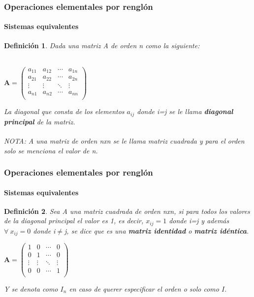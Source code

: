 \documentclass[11pt]{beamer}
\newtheorem{defi}{Definición}
\begin{document}
\begin{frame}
\frametitle{Operaciones elementales por renglón}
\framesubtitle{Sistemas equivalentes}
\begin{defi}
Dada una matriz A de orden n como la siguiente:\\ \hspace{0cm} \\
\begin{center}
${\displaystyle \mathbf {A} ={\begin{pmatrix}a_{11}&a_{12}&\cdots &a_{1n}\\a_{21}&a_{22}&\cdots &a_{2n}\\\vdots &\vdots &\ddots &\vdots \\a_{n1}&a_{n2}&\cdots &a_{nn}\\\end{pmatrix}}}$
\end{center}
La diagonal que consta de los elementos $a_{ij}$ donde i=j se le llama \textbf{diagonal principal} de la matriz.\\ \hspace{0cm} \\
NOTA: A una matriz de orden nxn se le llama matriz cuadrada y para el orden solo se menciona el valor de n.
\end{defi}
\end{frame}

\begin{frame}
\frametitle{Operaciones elementales por renglón}
\framesubtitle{Sistemas equivalentes}
\begin{defi}
Sea A una matriz cuadrada de orden nxn, si para todos los valores de la diagonal principal el valor es 1, es decir, $x_{ij} = 1$ donde i=j y además $\forall~x_{ij} = 0$ donde i$\neq$j, se dice que es una \textbf{matriz identidad} o \textbf{matriz idéntica}.  
\begin{center}
${\displaystyle \mathbf {A} ={\begin{pmatrix}1&0&\cdots &0\\0&1&\cdots &0\\\vdots &\vdots &\ddots &\vdots \\0&0&\cdots &1\\\end{pmatrix}}}$
\end{center}
Y se denota como $I_n$ en caso de querer especificar el orden o solo como $I$.
\end{defi}
\end{frame}
\end{document}
